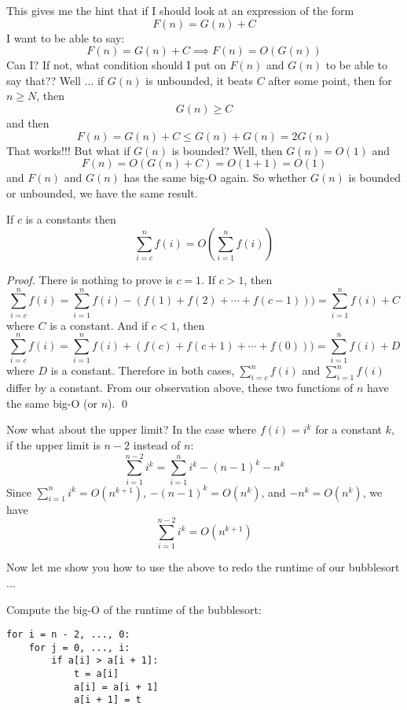 This gives me the hint that if I should look at an expression of the form
\[
F(n) = G(n) + C
\]
I want to be able to say:
\[
F(n) = G(n) + C \implies F(n) = O \left( G(n) \right)
\]
Can I?
If not, what condition should I put on $F(n)$ and $G(n)$ to be able to 
say that??
Well ... if $G(n)$ is unbounded, it beats 
$C$ after some point, then for $n \geq N$,
then 
\[
G(n) \geq C
\]
and then
\[
F(n) = G(n) + C \leq G(n) + G(n) = 2G(n)
\]
That works!!!
But what if $G(n)$ is bounded?
Well, then $G(n) = O(1)$ and
\[
F(n) = O(G(n) + C) = O(1 + 1) = O(1)
\]
and $F(n)$ and $G(n)$ has the same big-O again.
So whether $G(n)$ is bounded or unbounded, we have the same result.

\begin{thm} If $c$ is a constants then
\[
\sum_{i = c}^{n} f(i) =
O
\left(
\sum_{i = 1}^{n} f(i)
\right)
\]
\end{thm}

\textit{Proof.}
There is nothing to prove is $c = 1$.
If $c > 1$, then
\[
\sum_{i=c}^n f(i) 
= \sum_{i = 1}^{n} f(i) - (f(1) + f(2) + \cdots + f(c - 1))) 
= \sum_{i = 1}^{n} f(i) + C
\]
where $C$ is a constant.
And if $c < 1$, then
\[
\sum_{i=c}^n f(i) 
= \sum_{i = 1}^{n} f(i) + (f(c) + f(c+1) + \cdots + f(0)))
= \sum_{i = 1}^{n} f(i) + D
\]
where $D$ is a constant.
Therefore in both cases, 
$\sum_{i=c}^n f(i)$ and
$\sum_{i=1}^n f(i)$
differ by a constant.
From our observation above, these two functions of $n$ have the 
same big-O (or $n$).
\qed



Now what about the upper limit?
In the case where $f(i) = i^k$ for a constant $k$,
if the upper limit is $n - 2$ instead of $n$:
\[
\sum_{i = 1}^{n - 2} i^k
= \sum_{i=1}^n i^k - (n-1)^k - n^k 
\]
Since $\sum_{i=1}^n i^k = O(n^{k+1})$,
$-(n-1)^k = O(n^k)$, and $-n^k = O(n^k)$,
we have
\[
\sum_{i = 1}^{n - 2} i^k
= O(n^{k+1})
\]


Now let me show you how to use the above to redo the runtime
of our bubblesort ... 

\newpage

\begin{eg}
Compute the big-O of the runtime of the bubblesort:
\begin{Verbatim}[frame=single, fontsize=\footnotesize]
for i = n - 2, ..., 0:
    for j = 0, ..., i:
        if a[i] > a[i + 1]:
            t = a[i]
            a[i] = a[i + 1]
            a[i + 1] = t
\end{Verbatim}
\end{eg}

